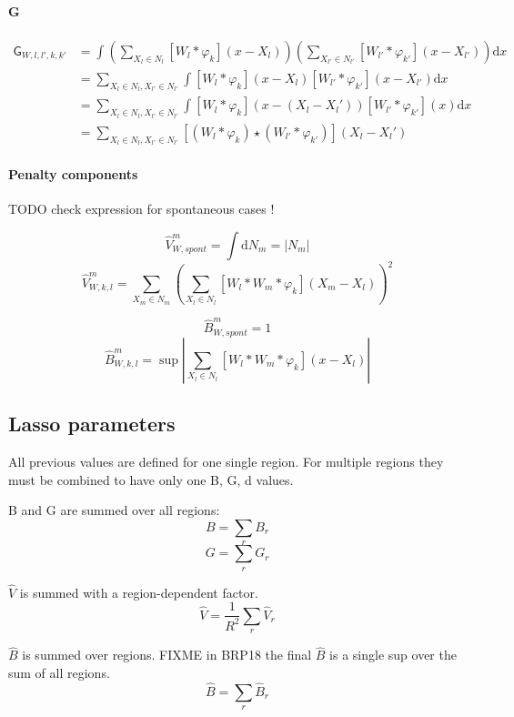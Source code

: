 \documentclass[a4paper,10pt]{article}
\newcommand\D{\mathrm{d}}
\newcommand\Convolution{\ast}
\newcommand\Correlation{\star}
\begin{document}
\paragraph{G}
\[ \begin{split}
    \mathsf{G}_{W,l,l',k,k'}
    & = \int \left( \sum_{X_l \in N_l} [W_l \Convolution \varphi_k](x-X_l) \right) \left( \sum_{X_{l'} \in N_{l'}} [W_{l'} \Convolution \varphi_{k'}](x-X_{l'}) \right) \D x \\
    & = \sum_{X_l \in N_l, X_{l'} \in N_{l'}} \int [W_l \Convolution \varphi_k](x-X_l) [W_{l'} \Convolution \varphi_{k'}](x-X_{l'}) \D x \\
    & = \sum_{X_l \in N_l, X_{l'} \in N_{l'}} \int [W_l \Convolution \varphi_k](x-(X_l-X_l')) [W_{l'} \Convolution \varphi_{k'}](x) \D x \\
    & = \sum_{X_l \in N_l, X_{l'} \in N_{l'}} [(W_l \Convolution \varphi_k) \Correlation (W_{l'} \Convolution \varphi_{k'})] (X_l-X_l')
\end{split} \]

\paragraph{Penalty components}
TODO check expression for spontaneous cases !

\[ \widehat{V}_{W,spont}^m = \int \D N_m = |N_m| \]
\[ \widehat{V}_{W,k,l}^m = \sum_{X_m \in N_m} \left( \sum_{X_l \in N_l} [W_l \Convolution W_m \Convolution \varphi_k](X_m-X_l) \right)^2 \]

\[ \widehat{B}_{W,spont}^m = 1 \]
\[ \widehat{B}_{W,k,l}^m = \sup |\sum_{X_l \in N_l} [W_l \Convolution W_m \Convolution \varphi_k](x - X_l)| \]

\subsection{Lasso parameters}

All previous values are defined for one single region.
For multiple regions they must be combined to have only one B, G, d values.

B and G are summed over all regions:
\[ B = \sum_r B_r \]
\[ G = \sum_r G_r \]

$\widehat{V}$ is summed with a region-dependent factor.
\[ \widehat{V} = \frac{1}{R^2} \sum_r \widehat{V}_r \]

$\widehat{B}$ is summed over regions. FIXME in BRP18 the final $\widehat{B}$ is a single sup over the sum of all regions.
\[ \widehat{B} = \sum_r \widehat{B}_r \]
\end{document}
